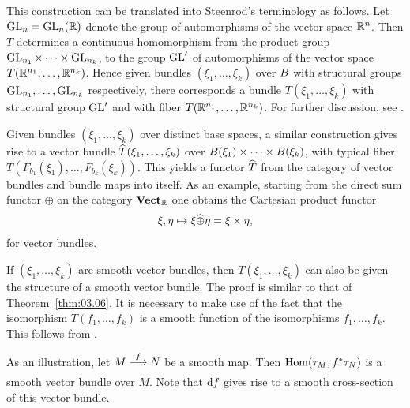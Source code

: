 \documentclass[../main]{subfiles}
\begin{document}
\setcounter{remark}{0}
\begin{remark}\label{rem:03.02}
This construction can be translated into Steenrod's terminology as follows. Let $\operatorname{GL}_n = \operatorname{GL}_n(\mathbb R)$ denote the group of automorphisms of the vector space $\mathbb R^n$. Then $T$ determines a continuous homomorphism from the product group $\operatorname{GL}_{n_1}\times\dots\times\operatorname{GL}_{n_k}$, to the group $\operatorname{GL}'$ of automorphisms of the vector space $T(\mathbb R^{n_{1}}, \dots, \mathbb R^{n_{k}})$. Hence given bundles $(\xi_1,\dots,\xi_k)$ over $B$ with structural groups $\operatorname{GL}_{n_1},\dots,\operatorname{GL}_{n_k}$ respectively, there corresponds a bundle $T(\xi_1,\dots,\xi_k)$ with structural group $\operatorname{GL}'$ and with fiber $T(\mathbb R^{n_{1}}, \dots, \mathbb R^{n_{k}})$. For further discussion, see \cite[$\S$3.6]{hirzebruchalggeo1966}.
\end{remark}


\begin{remark}\label{rem:03.03}
Given bundles $(\xi_1,\dots,\xi_k)$ over distinct base spaces, a similar construction gives rise to a vector bundle $\xhat{T}(\xi_1,\dots,\xi_k)$ over $B(\xi_1)\times\dots\times B(\xi_k)$, with typical fiber $T(F_{b_1}(\xi_1),\dots,F_{b_k}(\xi_k))$. This yields a functor $\xhat{T}$ from the category of vector bundles and bundle maps into itself. As an example, starting from the direct sum functor $\oplus$ on the category $\mathbf{Vect}_{\mathbb{R}}$ one obtains the Cartesian product functor
\[
\xi, \eta \mapsto \xi \xhat{\oplus} \eta=\xi \times \eta,
\]
for vector bundles.
\end{remark}


\begin{remark}\label{rem:03.04}
If $(\xi_1,\dots,\xi_k)$ are smooth vector bundles, then $T(\xi_1,\dots,\xi_k)$ can also be given the structure of a smooth vector bundle. The proof is similar to that of Theorem~\ref{thm:03.06}. It is necessary to make use of the fact that the isomorphism $T(f_1,\dots,f_k)$ is a smooth function of the isomorphisms $f_1,\dots,f_k$.
This follows from \cite[p. 128]{chevalley1999}.
\end{remark}


As an illustration, let $M \varrightarrow{f} N$ be a smooth map. Then $\operatorname{Hom}(\tau_{M},f^*\tau_{N})$ is a smooth vector bundle over $M$. Note that $\mathrm{d} f_{}$ gives rise to a smooth cross-section of this vector bundle.
\end{document}
